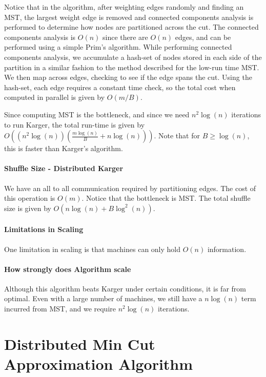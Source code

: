 \documentclass{article}
\begin{document}
Notice that in the algorithm, after weighting edges randomly and finding an MST, the largest weight edge is removed and connected components analysis is performed to determine how nodes are partitioned across the cut. The connected components analysis is $O(n)$ since there are $O(n)$ edges, and can be performed using a simple Prim's algorithm. While performing connected components analysis, we accumulate a hash-set of nodes stored in each side of the partition in a similar fashion to the method described for the low-run time MST. We then map across edges, checking to see if the edge spans the cut. Using the hash-set, each edge requires a constant time check, so the total cost when computed in parallel is given by $O(m/B)$.

Since computing MST is the bottleneck, and since we need $n^2 \log(n)$ iterations to run Karger, the total run-time is given by \\
$O((n^2 \log(n)) (\frac{m \log(n)}{B} + n \log(n)))$. Note that for $B \geq \log(n)$, this is faster than Karger's algorithm.

\paragraph{Shuffle Size - Distributed Karger}

We have an all to all communication required by partitioning edges. The cost of this operation is $O(m)$. Notice that the bottleneck is MST. The total shuffle size is given by $O(n\log(n) + B \log^2(n))$.

\paragraph{Limitations in Scaling} One limitation in scaling is that machines can only hold $O(n)$ information.

\paragraph{How strongly does Algorithm scale} Although this algorithm beats Karger under certain conditions, it is far from optimal. Even with a large number of machines, we still have a $n\log(n)$ term incurred from MST, and we require $n^2 \log(n)$ iterations.

\section{Distributed Min Cut Approximation Algorithm}
\end{document}

